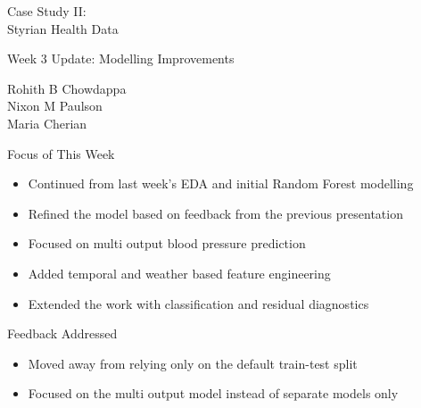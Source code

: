 {
\begin{frame}[noframenumbering]

\vspace{1.6cm}

\begin{center}
    {\fontsize{24}{28}\selectfont \color{tugreen}
    Case Study II: \\[0.3cm]
    Styrian Health Data}
\end{center}

\vspace{0.4cm}

\begin{center}
    {\large Week 3 Update: Modelling Improvements}
\end{center}

\vspace{0.3cm}

\begin{flushleft}
    {\normalsize
    Rohith B Chowdappa\\
    Nixon M Paulson\\
    Maria Cherian}
\end{flushleft}

\end{frame}
}

\begin{frame}{Focus of This Week}

\begin{itemize}
    \item Continued from last week's EDA and initial Random Forest modelling
    \item Refined the model based on feedback from the previous presentation
    \item Focused on multi output blood pressure prediction
    \item Added temporal and weather based feature engineering
    \item Extended the work with classification and residual diagnostics
\end{itemize}

\end{frame}

\begin{frame}{Feedback Addressed}

\begin{itemize}
    \item Moved away from relying only on the default train-test split
    \item Focused on the multi output model instead of separate models only
\end{itemize}

\end{frame}

